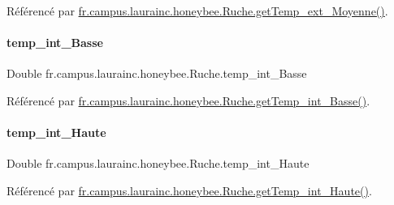 Référencé par \hyperlink{classfr_1_1campus_1_1laurainc_1_1honeybee_1_1_ruche_ae0d031ea6a9f44b45c3ffb97a066904c}{fr.\+campus.\+laurainc.\+honeybee.\+Ruche.\+get\+Temp\+\_\+ext\+\_\+\+Moyenne()}.

\mbox{\label{classfr_1_1campus_1_1laurainc_1_1honeybee_1_1_ruche_a09b3b4f5f23736064df7d6dd245d1210}} 
\paragraph{\texorpdfstring{temp\+\_\+int\+\_\+\+Basse}{temp\_int\_Basse}}
{\footnotesize\ttfamily Double fr.\+campus.\+laurainc.\+honeybee.\+Ruche.\+temp\+\_\+int\+\_\+\+Basse\hspace{0.3cm}{\ttfamily [private]}}



Référencé par \hyperlink{classfr_1_1campus_1_1laurainc_1_1honeybee_1_1_ruche_a32d803ef9eae5d0de4f03a60195ef84d}{fr.\+campus.\+laurainc.\+honeybee.\+Ruche.\+get\+Temp\+\_\+int\+\_\+\+Basse()}.

\mbox{\label{classfr_1_1campus_1_1laurainc_1_1honeybee_1_1_ruche_af50a9a4e5305bd1cd439e5071ed31c9c}} 
\paragraph{\texorpdfstring{temp\+\_\+int\+\_\+\+Haute}{temp\_int\_Haute}}
{\footnotesize\ttfamily Double fr.\+campus.\+laurainc.\+honeybee.\+Ruche.\+temp\+\_\+int\+\_\+\+Haute\hspace{0.3cm}{\ttfamily [private]}}



Référencé par \hyperlink{classfr_1_1campus_1_1laurainc_1_1honeybee_1_1_ruche_ab3abf832ec17a57a632d0c712902d282}{fr.\+campus.\+laurainc.\+honeybee.\+Ruche.\+get\+Temp\+\_\+int\+\_\+\+Haute()}.

